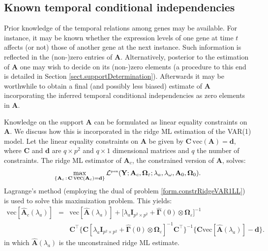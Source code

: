 \subsection{Known temporal conditional independencies} \label{sect:ridgeWithTemporalSupport}

Prior knowledge of the temporal relations among genes may be available. For instance, it may be known whether the expression levels of one gene at time $t$ affects (or not) those of another gene at the next instance. Such information is reflected in the (non-)zero entries of $\mathbf{A}$. Alternatively, posterior to the estimation of $\mathbf{A}$ one may wish to decide on its (non-)zero elements (a procedure to this end is detailed in Section \ref{sect.supportDetermination}). Afterwards it may be worthwhile to obtain a final (and possibly less biased) estimate of $\mathbf{A}$ incorporating the inferred temporal conditional independencies as zero elements in $\mathbf{A}$.

Knowledge on the support $\mathbf{A}$ can be formulated as linear equality constraints on $\mathbf{A}$. We discuss how this is incorporated in the ridge ML estimation of the VAR(1) model. Let the linear equality constraints on $\mathbf{A}$ be given by $\mathbf{C} \, \mbox{vec}(\mathbf{A}) = \mathbf{d}$, where $\mathbf{C}$ and $\mathbf{d}$ are $q \times p^2$ and $q \times 1$ dimensional matrices and $q$ the number of constraints. The ridge ML estimator of $\mathbf{A}_c$, the constrained version of $\mathbf{A}$, solves:
\begin{eqnarray} \label{form.constrRidgeVAR1LL}
\max_{\{\mathbf{A}_c \, : \, \mathbf{C} \, \mbox{vec}(\mathbf{A}_c) = \mathbf{d}\}} \mathcal{L}^{\mbox{{\tiny pen}}} (\mathbf{Y}; \mathbf{A}_c, \mathbf{\Omega}_{\varepsilon}; \lambda_a, \lambda_{\omega}, \mathbf{A}_0, \mathbf{\Omega}_0).
\end{eqnarray}
Lagrange's method (employing the dual of problem \ref{form.constrRidgeVAR1LL}) is used to solve this maximization problem. This yields:
\begin{eqnarray}
\nonumber \mbox{vec}[\hat{\mathbf{A}}_c (\lambda_a)] & = &  \mbox{vec}[ \hat{\mathbf{A}}(\lambda_a) ] +  \big[ \lambda_a \mathbf{I}_{p^2 \times p^2}  + \hat{\mathbf{\Gamma}}(0) \otimes \mathbf{\Omega}_{\varepsilon} \big]^{-1}
\\
& & \label{form.ridgeAhat.constrained}  \mathbf{C}^{\top} \{ \mathbf{C} [ \lambda_a \mathbf{I}_{p^2 \times p^2}  + \hat{\mathbf{\Gamma}}(0) \otimes \mathbf{\Omega}_{\varepsilon} ]^{-1}  \mathbf{C}^{\top}  \}^{-1} \{\mathbf{C} \mbox{vec}[ \hat{\mathbf{A}}(\lambda_a) ] - \mathbf{d} \}.
\end{eqnarray}
in which $\hat{\mathbf{A}}(\lambda_a)$ is the unconstrained ridge ML estimate.

